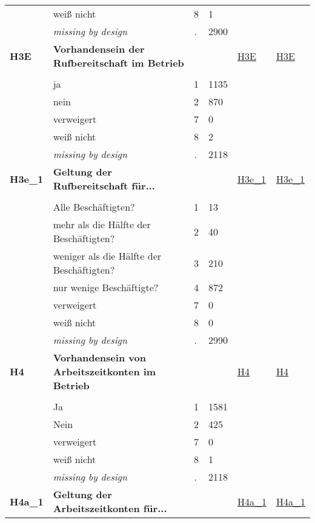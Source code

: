\begin{longtable}{| L{2.45cm} | L{6cm} | C{1.5cm} | R{1cm} | C{2.25cm} | C{2.25cm} |}
   & weiß nicht & 8 & 1 &  &  \\ 
   & \textit{missing by design} & \textit{.} & 2900 &  &  \\ 
   \midrule
\textbf{H3E}\label{var:H3E} & \textbf{Vorhandensein der Rufbereitschaft im Betrieb} &  &  & \hyperref[H3E]{H3E} & \hyperref[var:suf:H3E]{H3E} \\ 
   &  &  &  &  &  \\ 
   & ja & 1 & 1135 &  &  \\ 
   & nein & 2 & 870 &  &  \\ 
   & verweigert & 7 & 0 &  &  \\ 
   & weiß nicht & 8 & 2 &  &  \\ 
   & \textit{missing by design} & \textit{.} & 2118 &  &  \\ 
   \midrule
\textbf{H3e\_1}\label{var:H3e:1} & \textbf{Geltung der Rufbereitschaft für...} &  &  & \hyperref[H3e:1]{H3e\_1} & \hyperref[var:suf:H3e:1]{H3e\_1} \\ 
   &  &  &  &  &  \\ 
   & Alle Beschäftigten? & 1 & 13 &  &  \\ 
   & mehr als die Hälfte der Beschäftigten? & 2 & 40 &  &  \\ 
   & weniger als die Hälfte der Beschäftigten? & 3 & 210 &  &  \\ 
   & nur wenige Beschäftigte? & 4 & 872 &  &  \\ 
   & verweigert & 7 & 0 &  &  \\ 
   & weiß nicht & 8 & 0 &  &  \\ 
   & \textit{missing by design} & \textit{.} & 2990 &  &  \\ 
   \midrule
\textbf{H4}\label{var:H4} & \textbf{Vorhandensein von Arbeitszeitkonten im Betrieb} &  &  & \hyperref[H4]{H4} & \hyperref[var:suf:H4]{H4} \\ 
   &  &  &  &  &  \\ 
   & Ja & 1 & 1581 &  &  \\ 
   & Nein & 2 & 425 &  &  \\ 
   & verweigert & 7 & 0 &  &  \\ 
   & weiß nicht & 8 & 1 &  &  \\ 
   & \textit{missing by design} & \textit{.} & 2118 &  &  \\ 
   \midrule
\textbf{H4a\_1}\label{var:H4a:1} & \textbf{Geltung der Arbeitszeitkonten für...} &  &  & \hyperref[H4a:1]{H4a\_1} & \hyperref[var:suf:H4a:1]{H4a\_1} \\ 

\end{longtable}
